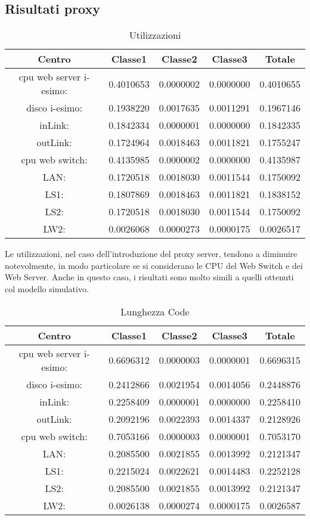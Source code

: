 \subsection{Risultati proxy}
\begin{table}[H]
\begin{center}
\begin{tabular}{||c|c|c|c|c||}
\hline
Centro &Classe1 &Classe2 &Classe3 &Totale\\
\hline
\hline
 cpu web server i-esimo: 	&0.4010653	&0.0000002	&0.0000000	&0.4010655	\\\hline
 disco i-esimo: 	&0.1938220	&0.0017635	&0.0011291	&0.1967146	\\\hline
 inLink: 	&0.1842334	&0.0000001	&0.0000000	&0.1842335	\\\hline
 outLink: 	&0.1724964	&0.0018463	&0.0011821	&0.1755247	\\\hline
 cpu web switch: 	&0.4135985	&0.0000002	&0.0000000	&0.4135987	\\\hline
 LAN: 	&0.1720518	&0.0018030	&0.0011544	&0.1750092	\\\hline
 LS1: 	&0.1807869	&0.0018463	&0.0011821	&0.1838152	\\\hline
 LS2:	&0.1720518	&0.0018030	&0.0011544	&0.1750092	\\\hline
 LW2: 	&0.0026068	&0.0000273	&0.0000175	&0.0026517	\\\hline
\end{tabular}
\end{center}
\caption{Utilizzazioni}
\label{utilizzazioni}
\end{table}
Le utilizzazioni, nel caso dell'introduzione del proxy server, tendono a diminuire notevolmente, in modo particolare se si considerano le CPU del Web Switch e dei Web Server. Anche in questo caso, i risultati sono molto simili a quelli ottenuti col modello simulativo.
\begin{table}[H]
\begin{center}
\begin{tabular}{||c|c|c|c|c||}
\hline
Centro &Classe1 &Classe2 &Classe3 &Totale\\
\hline
\hline
 cpu web server i-esimo: 	&0.6696312	&0.0000003	&0.0000001	&0.6696315	\\\hline
 disco i-esimo: 	&0.2412866	&0.0021954	&0.0014056	&0.2448876	\\\hline
 inLink: 	&0.2258409	&0.0000001	&0.0000000	&0.2258410	\\\hline
 outLink: 	&0.2092196	&0.0022393	&0.0014337	&0.2128926	\\\hline
 cpu web switch: 	&0.7053166	&0.0000003	&0.0000001	&0.7053170	\\\hline
 LAN: 	&0.2085500	&0.0021855	&0.0013992	&0.2121347	\\\hline
 LS1: 	&0.2215024	&0.0022621	&0.0014483	&0.2252128	\\\hline
 LS2: 	&0.2085500	&0.0021855	&0.0013992	&0.2121347	\\\hline
 LW2: 	&0.0026138	&0.0000274	&0.0000175	&0.0026587	\\\hline
\end{tabular}
\end{center}
\caption{Lunghezza Code}
\label{lunghezzacode}
\end{table}
